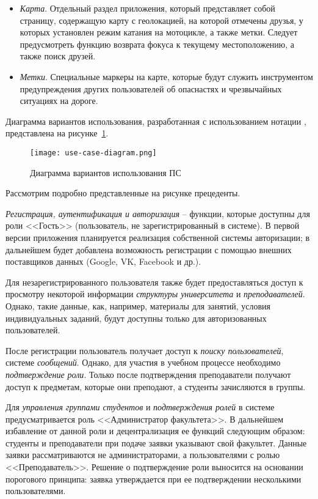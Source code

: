 \begin{itemize}
	\item \emph{Карта}. Отдельный раздел приложения, который представляет собой страницу, содержащую карту с геолокацией, на которой отмечены друзья, у которых установлен режим катания на мотоцикле, а также метки. Следует предусмотреть функцию возврата фокуса к текущему местоположению, а также поиск друзей.
	\item \emph{Метки}. Специальные маркеры на карте, которые будут служить инструментом предупреждения других пользователей об опаснастях и чрезвычайных ситуациях на дороге.
\end{itemize}

Диаграмма вариантов использования, разработанная с использованием нотации \uml, представлена на рисунке~\ref{fig:domain:model:use_cases:model}.

\begin{figure}
\centering
	\texttt{[image: use-case-diagram.png]}
	\caption{Диаграмма вариантов использования ПС}
	\label{fig:domain:model:use_cases:model}
\end{figure}

Рассмотрим подробно представленные на рисунке прецеденты.

\emph{Регистрация, аутентификация и авторизация} -- функции, которые доступны для роли <<Гость>> (пользователь, не зарегистрированный в системе). В первой версии приложения планируется реализация собственной системы авторизации; в дальнейшем будет добавлена возможность регистрации с помощью внешних поставщиков данных (Google, VK, Facebook и др.).

Для незарегистрированного пользователя также будет предоставляться доступ к просмотру некоторой информации \emph{структуры университета} и \emph{преподавателей}. Однако, такие данные, как, например, материалы для занятий, условия индивидуальных заданий, будут доступны только для авторизованных пользователей. 

После регистрации пользователь получает доступ к \emph{поиску пользователей}, системе \emph{сообщений}. Однако, для участия в учебном процессе необходимо \emph{подтверждение роли}. Только после подтверждения преподаватели получают доступ к предметам, которые они преподают, а студенты зачисляются в группы. 

Для \emph{управления группами студентов} и \emph{подтверждения ролей} в системе предусматривается роль <<Администратор факультета>>. В дальнейшем избавление от данной роли и децентрализация ее функций следующим образом: студенты и преподаватели при подаче заявки указывают свой факультет. Данные заявки рассматриваются не администраторами, а пользователями с ролью <<Преподаватель>>. Решение о подтверждение роли выносится на основании порогового принципа: заявка утверждается при ее подтверждении несколькими пользователями. 

